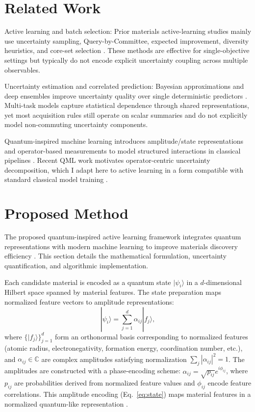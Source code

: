 \documentclass[conference]{IEEEtran}
\begin{document}
\section{Related Work}

Active learning and batch selection: Prior materials active-learning studies mainly use uncertainty sampling, Query-by-Committee, expected improvement, diversity heuristics, and core-set selection \cite{wang2023active, huang2024machine, ren2022accelerating, settles2022active, kim2021task}. These methods are effective for single-objective settings but typically do not encode explicit uncertainty coupling across multiple observables.

Uncertainty estimation and correlated prediction: Bayesian approximations and deep ensembles improve uncertainty quality over single deterministic predictors \cite{gal2016dropout, lakshminarayanan2017simple}. Multi-task models capture statistical dependence through shared representations, yet most acquisition rules still operate on scalar summaries and do not explicitly model non-commuting uncertainty components.

Quantum-inspired machine learning introduces amplitude/state representations and operator-based measurements to model structured interactions in classical pipelines \cite{schuld2023machine, li2023quantum}. Recent QML work motivates operator-centric uncertainty decomposition, which I adapt here to active learning in a form compatible with standard classical model training \cite{cerezo2021variational, bharti2022nisq, abbas2021power, zhou2024quantum}.

\section{Proposed Method}

The proposed quantum-inspired active learning framework integrates quantum representations with modern machine learning to improve materials discovery efficiency \cite{abbas2021power, bharti2022nisq, cerezo2021variational}. This section details the mathematical formulation, uncertainty quantification, and algorithmic implementation.

Each candidate material is encoded as a quantum state $|\psi_i\rangle$ in a $d$-dimensional Hilbert space spanned by material features. The state preparation maps normalized feature vectors to amplitude representations:
\begin{equation}
|\psi_i\rangle = \sum_{j=1}^{d} \alpha_{ij} |f_j\rangle,\label{eq:state}
\end{equation}
where $\{|f_j\rangle\}_{j=1}^d$ form an orthonormal basis corresponding to normalized features (atomic radius, electronegativity, formation energy, coordination number, etc.), and $\alpha_{ij} \in \mathbb{C}$ are complex amplitudes satisfying normalization $\sum_j |\alpha_{ij}|^2 = 1$. The amplitudes are constructed with a phase-encoding scheme: $\alpha_{ij} = \sqrt{p_{ij}} e^{i\phi_{ij}}$, where $p_{ij}$ are probabilities derived from normalized feature values and $\phi_{ij}$ encode feature correlations. This amplitude encoding (Eq.~\eqref{eq:state}) maps material features in a normalized quantum-like representation \cite{schuld2023machine}.
\end{document}
